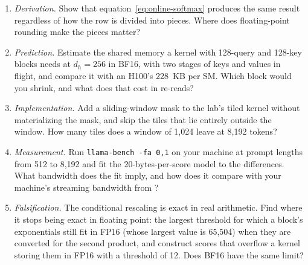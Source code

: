 \ExercisesSection

\begin{enumerate}
\item \emph{Derivation.} Show that equation~\eqref{eq:online-softmax} produces
the same result regardless of how the row is divided into pieces. Where does
floating-point rounding make the pieces matter?
\item \emph{Prediction.} Estimate the shared memory a kernel with 128-query and
128-key blocks needs at $d_h = 256$ in BF16, with two stages of keys and values
in flight, and compare it with an H100's 228~KB per SM. Which block would you
shrink, and what does that cost in re-reads?
\item \emph{Implementation.} Add a sliding-window mask to the lab's tiled
kernel without materializing the mask, and skip the tiles that lie entirely
outside the window. How many tiles does a window of 1,024 leave at 8,192 tokens?
\item \emph{Measurement.} Run \texttt{llama-bench -fa 0,1} on your machine at
prompt lengths from 512 to 8,192 and fit the 20-bytes-per-score model to the
differences. What bandwidth does the fit imply, and how does it compare with
your machine's streaming bandwidth from ?
\item \emph{Falsification.} The conditional rescaling is exact in real
arithmetic. Find where it stops being exact in floating point: the largest
threshold for which a block's exponentials still fit in FP16 (whose largest
value is 65,504) when they are converted for the second product, and construct
scores that overflow a kernel storing them in FP16 with a threshold of 12. Does
BF16 have the same limit?
\end{enumerate}


